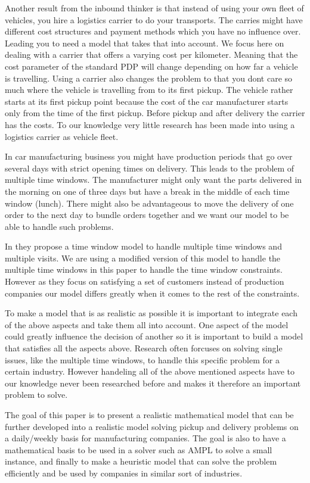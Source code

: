 \documentclass[../main.tex]{subfiles}
\begin{document}
Another result from the inbound thinker is that instead of using your own fleet of vehicles, you hire a logistics carrier to do your transports.
The carries might have different cost structures and payment methods which you have no influence over.
Leading you to need a model that takes that into account.
We focus here on dealing with a carrier that offers a varying cost per kilometer.
Meaning that the cost parameter of the standard PDP will change depending on how far a vehicle is travelling. 
Using a carrier also changes the problem to that you dont care so much where the vehicle is travelling from to its first pickup.   
The vehicle rather starts at its first pickup point because the cost of the car manufacturer starts only from the time of the first pickup.
Before pickup and after delivery the carrier has the costs. To our knowledge very little research has been made into using a logistics carrier as vehicle fleet. \par

In car manufacturing business you might have production periods that go over several days with strict opening times on delivery. 
This leads to the problem of multiple time windows.
The manufacturer might only want the parts delivered in the morning on one of three days but have a break in the middle of each time window (lunch). 
There might also be advantageous to move the delivery of one order to the next day to bundle orders together and we want our model to be able to handle such problems. \par
In \cite{favaretto07} they propose a time window model to handle multiple time windows and multiple visits. 
We are using a modified version of this model to handle the multiple time windows in this paper to handle the time window constraints.
However as they focus on satisfying a set of customers instead of production companies our model differs greatly when it comes to the rest of the constraints.\par
\par
To make a model that is as realistic as possible it is important to integrate each of the above aspects and take them all into account. 
One aspect of the model could greatly influence the decision of another so it is important to build a model that satisfies all the aspects above. 
Research often forcuses on solving single issues, like the multiple time windows, to handle this specific problem for a certain industry. 
However handeling all of the above mentioned aspects have to our knowledge never been researched before and makes it therefore an important problem to solve. 
\par
The goal of this paper is to present a realistic mathematical model that can be further developed into a realistic model solving pickup and delivery problems on a daily/weekly basis for manufacturing companies. 
The goal is also to have a mathematical basis to be used in a solver such as AMPL to solve a small instance, and finally to make a heuristic model that can solve the problem efficiently and be used by companies in similar sort of industries.


\biblio
\end{document}
